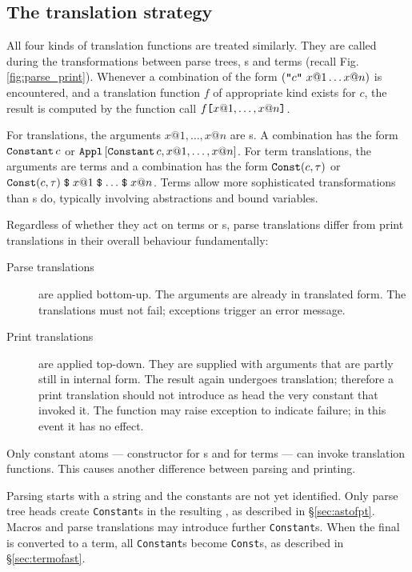\subsection{The translation strategy}
All four kinds of translation functions are treated similarly.  They are
called during the transformations between parse trees, \AST{}s and terms
(recall Fig.\ts\ref{fig:parse_print}).  Whenever a combination of the form
$(\mbox{\tt "}c\mbox{\tt "}~x@1 \ldots x@n)$ is encountered, and a translation function
$f$ of appropriate kind exists for $c$, the result is computed by the \ML{}
function call $f \mbox{\tt [} x@1, \ldots, x@n \mbox{\tt ]}$.

For \AST{} translations, the arguments $x@1, \ldots, x@n$ are \AST{}s.  A
combination has the form $\mathop{\mbox{\tt Constant}}\nolimits c$ or $\mathop{\mbox{\tt Appl}}\nolimits\,[\mathop{\mbox{\tt Constant}}\nolimits c, x@1, \ldots,
  x@n]$.  For term translations, the arguments are terms and a combination
has the form $\mathop{\mbox{\tt Const}}\nolimits (c, \tau)$ or $\mathop{\mbox{\tt Const}}\nolimits (c, \tau) \mathrel{\hbox{\tt\$}}
x@1 \mathrel{\hbox{\tt\$}} \ldots \mathrel{\hbox{\tt\$}} x@n$.  Terms allow more sophisticated
transformations than \AST{}s do, typically involving abstractions and bound
variables.

Regardless of whether they act on terms or \AST{}s, parse translations differ
from print translations in their overall behaviour fundamentally:
\begin{description}
\item[Parse translations] are applied bottom-up.  The arguments are already
  in translated form.  The translations must not fail; exceptions trigger
  an error message.

\item[Print translations] are applied top-down.  They are supplied with
  arguments that are partly still in internal form.  The result again
  undergoes translation; therefore a print translation should not introduce
  as head the very constant that invoked it.  The function may raise
  exception  to indicate failure; in this event it has no
  effect.
\end{description}

Only constant atoms --- constructor  for \AST{}s and
 for terms --- can invoke translation functions.  This
causes another difference between parsing and printing.

Parsing starts with a string and the constants are not yet identified.
Only parse tree heads create {\tt Constant}s in the resulting \AST, as
described in \S\ref{sec:astofpt}.  Macros and parse \AST{} translations may
introduce further {\tt Constant}s.  When the final \AST{} is converted to a
term, all {\tt Constant}s become {\tt Const}s, as described in
\S\ref{sec:termofast}.

